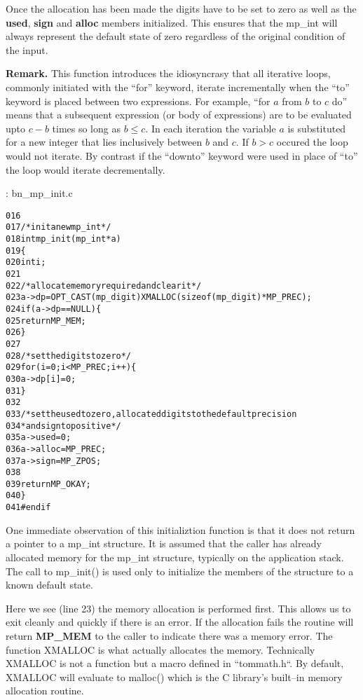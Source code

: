 \documentclass[b5paper]{book}
\begin{document}
Once the allocation has been made the digits have to be set to zero as well as the \textbf{used}, \textbf{sign} and
\textbf{alloc} members initialized.  This ensures that the mp\_int will always represent the default state of zero regardless
of the original condition of the input.

\textbf{Remark.}
This function introduces the idiosyncrasy that all iterative loops, commonly initiated with the ``for'' keyword, iterate incrementally
when the ``to'' keyword is placed between two expressions.  For example, ``for $a$ from $b$ to $c$ do'' means that
a subsequent expression (or body of expressions) are to be evaluated upto $c - b$ times so long as $b \le c$.  In each
iteration the variable $a$ is substituted for a new integer that lies inclusively between $b$ and $c$.  If $b > c$ occured
the loop would not iterate.  By contrast if the ``downto'' keyword were used in place of ``to'' the loop would iterate 
decrementally.

\vspace{+3mm}\begin{small}
\hspace{-5.1mm}{\bf File}: bn\_mp\_init.c
\vspace{-3mm}
\begin{alltt}
016   
017   /* init a new mp_int */
018   int mp_init (mp_int * a)
019   \{
020     int i;
021   
022     /* allocate memory required and clear it */
023     a->dp = OPT_CAST(mp_digit) XMALLOC (sizeof (mp_digit) * MP_PREC);
024     if (a->dp == NULL) \{
025       return MP_MEM;
026     \}
027   
028     /* set the digits to zero */
029     for (i = 0; i < MP_PREC; i++) \{
030         a->dp[i] = 0;
031     \}
032   
033     /* set the used to zero, allocated digits to the default precision
034      * and sign to positive */
035     a->used  = 0;
036     a->alloc = MP_PREC;
037     a->sign  = MP_ZPOS;
038   
039     return MP_OKAY;
040   \}
041   #endif
\end{alltt}
\end{small}

One immediate observation of this initializtion function is that it does not return a pointer to a mp\_int structure.  It 
is assumed that the caller has already allocated memory for the mp\_int structure, typically on the application stack.  The 
call to mp\_init() is used only to initialize the members of the structure to a known default state.  

Here we see (line 23) the memory allocation is performed first.  This allows us to exit cleanly and quickly
if there is an error.  If the allocation fails the routine will return \textbf{MP\_MEM} to the caller to indicate there
was a memory error.  The function XMALLOC is what actually allocates the memory.  Technically XMALLOC is not a function
but a macro defined in ``tommath.h``.  By default, XMALLOC will evaluate to malloc() which is the C library's built--in
memory allocation routine.
\end{document}
